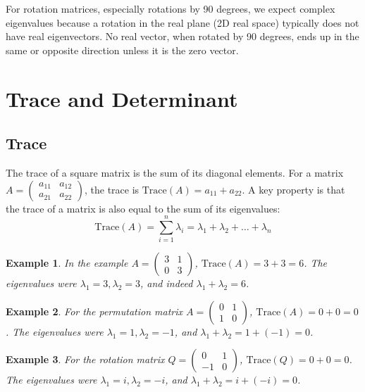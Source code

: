 \documentclass{article}
\newtheorem{example}{Example}
\begin{document}
For rotation matrices, especially rotations by 90 degrees, we expect complex eigenvalues because a rotation in the real plane (2D real space) typically does not have real eigenvectors. No real vector, when rotated by 90 degrees, ends up in the same or opposite direction unless it is the zero vector.

\section{Trace and Determinant}

\subsection{Trace}
The trace of a square matrix is the sum of its diagonal elements.
For a matrix $A = \begin{pmatrix} a_{11} & a_{12} \\ a_{21} & a_{22} \end{pmatrix}$, the trace is $\text{Trace}(A) = a_{11} + a_{22}$.
A key property is that the trace of a matrix is also equal to the sum of its eigenvalues:
\[\text{Trace}(A) = \sum_{i=1}^{n} \lambda_i = \lambda_1 + \lambda_2 + \dots + \lambda_n\]
\begin{example}
In the example $A = \begin{pmatrix} 3 & 1 \\ 0 & 3 \end{pmatrix}$, $\text{Trace}(A) = 3 + 3 = 6$. The eigenvalues were $\lambda_1 = 3, \lambda_2 = 3$, and indeed $\lambda_1 + \lambda_2 = 6$.
\end{example}
\begin{example}
For the permutation matrix $A = \begin{pmatrix} 0 & 1 \\ 1 & 0 \end{pmatrix}$, $\text{Trace}(A) = 0 + 0 = 0$. The eigenvalues were $\lambda_1 = 1, \lambda_2 = -1$, and $\lambda_1 + \lambda_2 = 1 + (-1) = 0$.
\end{example}
\begin{example}
For the rotation matrix $Q = \begin{pmatrix} 0 & 1 \\ -1 & 0 \end{pmatrix}$, $\text{Trace}(Q) = 0 + 0 = 0$. The eigenvalues were $\lambda_1 = i, \lambda_2 = -i$, and $\lambda_1 + \lambda_2 = i + (-i) = 0$.
\end{example}
\end{document}
